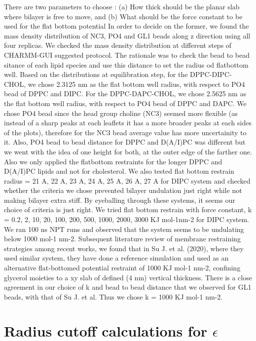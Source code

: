 \documentclass[10pt]{article}
\let\oldsection\section
\renewcommand{\section}{\clearpage\oldsection}
\begin{document}
There are two parameters to choose : (a) How thick should be the planar slab where bilayer is free to move, and
(b) What should be the force constant to be used for the flat bottom potential
In order to decide on the former, we found the mass density distribution of NC3, PO4 and GL1 beads along z direction using all four replicas.
We checked the mass density distribution at different steps of CHARMM-GUI suggested protocol.
The rationale was to check the bead to bead sitance of each lipid species and use this distance to set the radius od flatbottom well.
Based on the distributions at equilibration step, for the DPPC-DIPC-CHOL, we chose 2.3125 nm as the flat bottom well radius, with respect to PO4 bead of DPPC and DIPC.
For the DPPC-DAPC-CHOL, we chose 2.5625 nm as the flat bottom well radius, with respect to PO4 bead of DPPC and DAPC.
We chose PO4 bead since the head group choline (NC3) seemed more flexible (as instead of a sharp peaks at each leaflets it has a more broader peaks at each sides of the plots), therefore for the NC3 bead average value has more uncertainity to it.
Also, PO4 bead to bead distance for DPPC and D(A/I)PC was different but we went with the idea of one height for both, at the outer edge of the farther one.
Also we only applied the flatbottom restraints for the longer DPPC and D(A/I)PC lipids and not for cholesterol.
We also tested flat bottom restrain radius = 21 A, 22 A, 23 A, 24 A, 25 A, 26 A, 27 A for DIPC system and checked whether the criteria we chose prevented bilayer undulation just right while not making bilayer extra stiff.
By eyeballing through these systems, it seems our choice of criteria is just right.
We tried flat bottom restrain with force constant, k = 0.2, 2, 10, 20, 100, 200, 500, 1000, 2000, 3000 KJ mol-1nm-2 for DIPC system.
We ran 100 ns NPT runs and observed that the system seems to be undulating below 1000 mol-1 nm-2. 
Subsequent literature review of membrane restraining strategies among recent works, we found that in Su J. et al. (2020), where they used similar system, they have done a reference simulation and used as an alternative flat-bottomed potential restraint of 1000 KJ mol-1 nm-2, confining glycerol moieties to a xy slab of defined (4 nm) vertical thickness.
There is a close agreement in our choice of k and bead to bead distance that we observed for GL1 beads, with that of Su J. et al.
Thus we chose k = 1000 KJ mol-1 nm-2.


\section*{Radius cutoff calculations for $\epsilon$}
\end{document}
